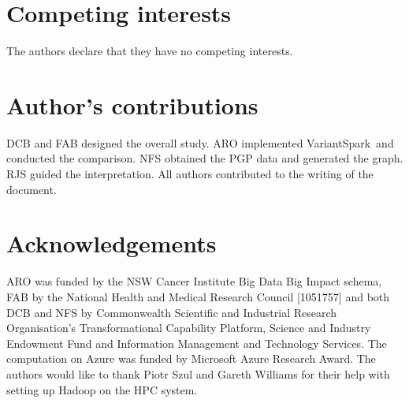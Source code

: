\documentclass{bmcart}
\newcommand{\variantSpark}{{\sc VariantSpark}}
\begin{document}

\begin{backmatter}

\section*{Competing interests}
  The authors declare that they have no competing interests.

\section*{Author's contributions}
    DCB and FAB designed the overall study. ARO implemented \variantSpark\ and conducted the comparison. NFS obtained the PGP data and generated the graph. RJS guided the interpretation. 
    All authors contributed to the writing of the document. 

\section*{Acknowledgements}
  ARO was funded by the NSW Cancer Institute Big Data Big Impact schema, FAB by the National Health and Medical Research Council [1051757] and both DCB and NFS by Commonwealth Scientific and Industrial Research Organisation's Transformational Capability Platform, Science and Industry Endowment Fund and Information Management and Technology Services. The computation on Azure was funded by Microsoft Azure Research Award. 
The authors would like to thank Piotr Szul and Gareth Williams for their help with setting up Hadoop on the HPC system.



\end{backmatter}
\end{document}
